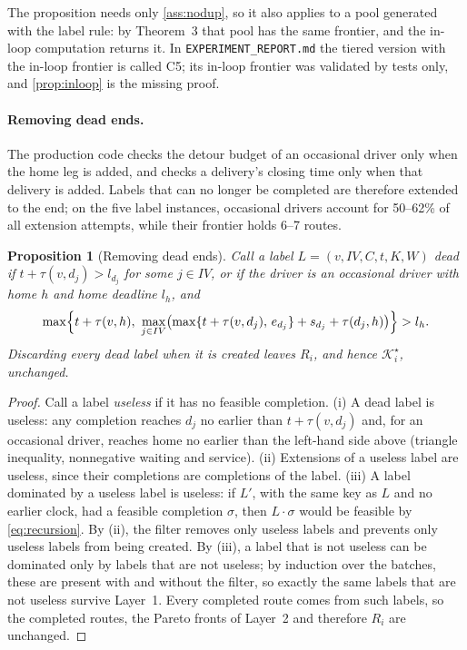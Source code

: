\documentclass[11pt]{article}
\newtheorem{proposition}{Proposition}
\theoremstyle{definition}
\theoremstyle{remark}
\newcommand{\Ks}{\mathcal{K}^{\star}}
\begin{document}
The proposition needs only \cref{ass:nodup}, so it also applies to a pool
generated with the label rule: by Theorem~3 that pool has the same frontier,
and the in-loop computation returns it. In \texttt{EXPERIMENT\_REPORT.md} the
tiered version with the in-loop frontier is called C5; its in-loop frontier was
validated by tests only, and \cref{prop:inloop} is the missing proof.

\paragraph{Removing dead ends.} The production code checks the detour budget
of an occasional driver only when the home leg is added, and checks a
delivery's closing time only when that delivery is added. Labels that can no
longer be completed are therefore extended to the end; on the five label
instances, occasional drivers account for 50--62\% of all extension attempts,
while their frontier holds 6--7 routes.

\begin{proposition}[Removing dead ends]\label{prop:dead}
Call a label $L=(v,IV,C,t,K,W)$ \emph{dead} if $t+\tau(v,d_j)>l_{d_j}$ for some
$j\in IV$, or if the driver is an occasional driver with home $h$ and home
deadline $l_h$, and
\[
\max\Bigl\{t+\tau(v,h),\ \max_{j\in IV}\bigl(\max\{t+\tau(v,d_j),\,e_{d_j}\}+s_{d_j}+\tau(d_j,h)\bigr)\Bigr\}>l_h .
\]
Discarding every dead label when it is created leaves $R_i$, and hence $\Ks_i$,
unchanged.
\end{proposition}

\begin{proof}
Call a label \emph{useless} if it has no feasible completion. (i) A dead label is
useless: any completion reaches $d_j$ no earlier than $t+\tau(v,d_j)$ and, for an
occasional driver, reaches home no earlier than the left-hand side above
(triangle inequality, nonnegative waiting and service). (ii) Extensions of a
useless label are useless, since their completions are completions of the
label. (iii) A label dominated by a useless label is useless: if $L'$, with the same
key as $L$ and no earlier clock, had a feasible completion $\sigma$, then
$L\cdot\sigma$ would be feasible by \eqref{eq:recursion}. By (ii), the filter
removes only useless labels and prevents only useless labels from being created.
By (iii), a label that is not useless can be dominated only by labels that are
not useless; by induction over the batches, these are present with and without
the filter, so exactly the same labels that are not useless survive Layer~1.
Every completed route comes from such labels, so the completed routes, the
Pareto fronts of Layer~2 and therefore $R_i$ are unchanged.
\end{proof}
\end{document}

